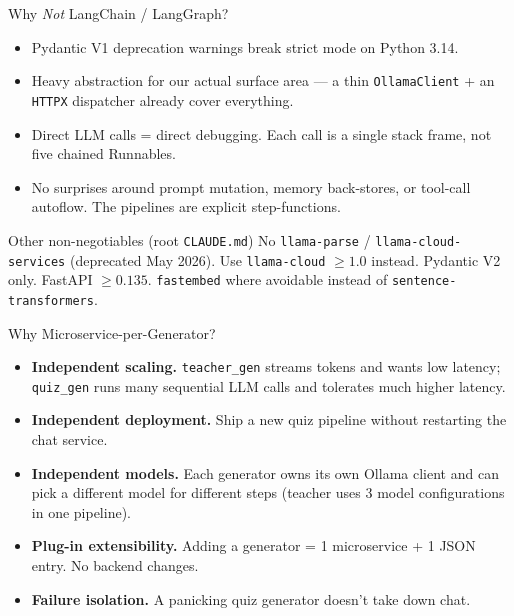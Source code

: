 \documentclass[aspectratio=169, 10pt]{beamer}
\begin{document}
\begin{frame}{Why \emph{Not} LangChain / LangGraph?}
  \begin{itemize}
    \item Pydantic V1 deprecation warnings break strict mode on
          Python 3.14.
    \item Heavy abstraction for our actual surface area --- a thin
          \texttt{OllamaClient} + an \texttt{HTTPX} dispatcher already
          cover everything.
    \item Direct LLM calls = direct debugging. Each call is a single
          stack frame, not five chained Runnables.
    \item No surprises around prompt mutation, memory back-stores, or
          tool-call autoflow. The pipelines are explicit step-functions.
  \end{itemize}

  \begin{alertblock}{Other non-negotiables (root \texttt{CLAUDE.md})}
    \scriptsize
    No \texttt{llama-parse} / \texttt{llama-cloud-services} (deprecated
    May 2026). Use \texttt{llama-cloud} $\geq 1.0$ instead. Pydantic V2
    only. FastAPI $\geq 0.135$. \texttt{fastembed} where avoidable
    instead of \texttt{sentence-transformers}.
  \end{alertblock}
\end{frame}

\begin{frame}{Why Microservice-per-Generator?}
  \begin{itemize}
    \item \textbf{Independent scaling.} \texttt{teacher\_gen} streams
          tokens and wants low latency; \texttt{quiz\_gen} runs many
          sequential LLM calls and tolerates much higher latency.
    \item \textbf{Independent deployment.} Ship a new quiz pipeline
          without restarting the chat service.
    \item \textbf{Independent models.} Each generator owns its own
          Ollama client and can pick a different model for different
          steps (teacher uses 3 model configurations in one pipeline).
    \item \textbf{Plug-in extensibility.} Adding a generator =
          1 microservice + 1 JSON entry. No backend changes.
    \item \textbf{Failure isolation.} A panicking quiz generator
          doesn't take down chat.
  \end{itemize}
\end{frame}
\end{document}

